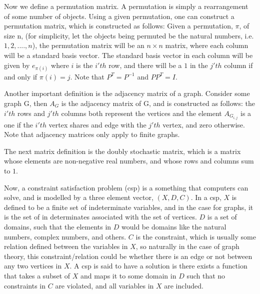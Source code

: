\documentclass[12pt]{article}
\begin{document}
Now we define a permutation matrix. A permutation is simply a rearrangement of some number of objects. Using a given permutation, one can construct a permutation matrix, which is constructed as follows: Given a permutation, $\pi$, of size n, (for simplicity, let the objects being permuted be the natural numbers, i.e. $1, 2, ...., n$), the permutation matrix will be an $n \times n$ matrix, where each column will be a standard basis vector. The standard basis vector in each column will be given by $e_{\pi(i)}$ where $i$ is the $i'th$ row, and there will be a $1$ in the $j'th$ column if and only if $\pi(i) = j$. Note that $P^T = P^{-1}$ and $PP^T = I$. 

Another important definition is the adjacency matrix of a graph. Consider some graph G, then $A_G$ is the adjacency matrix of G, and is constructed as follows: the $i'th$ rows and $j'th$ columns both represent the vertices and the element $A_{G_{i, j}}$ is a one if the $i'th$ vertex shares and edge with the $j'th$ vertex, and zero otherwise. Note that adjacency matrices only apply to finite graphs.

The next matrix definition is the \hypertarget{stochastic}{doubly stochastic matrix}, which is a matrix whose elements are non-negative real numbers, and whose rows and columns sum to $1$.

Now, a constraint satisfaction problem (csp) is a something that computers can solve, and is modelled by a three element vector, $(X, D, C)$. In a csp, $X$ is defined to be a finite set of indeterminate variables, and in the case for graphs, it is the set of in determinates associated with the set of vertices. $D$ is a set of domains, such that the elements in $D$ would be domains like the natural numbers, complex numbers, and others. $C$ is the constraint, which is usually some relation defined between the variables in $X$, so naturally in the case of graph theory, this constraint/relation could be whether there is an edge or not between any two vertices in $X$. A csp is said to have a solution is there exists a function that takes a subset of $X$ and maps it to some domain in $D$ such that no constraints in $C$ are violated, and all variables in $X$ are included.
\end{document}
